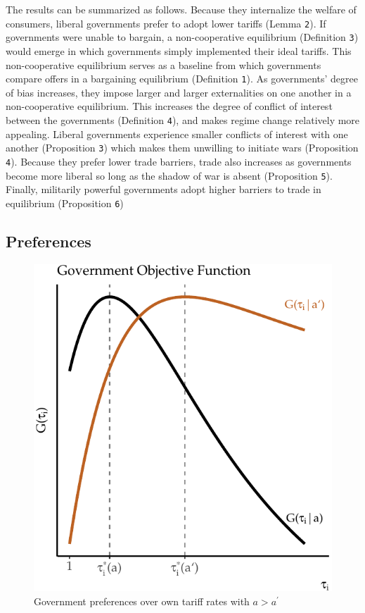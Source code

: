 \documentclass{puthesis}
\begin{document}
The results can be summarized as follows. Because they internalize the
welfare of consumers, liberal governments prefer to adopt lower tariffs
(Lemma \texttt{2}). If governments were unable to bargain, a
non-cooperative equilibrium (Definition \texttt{3}) would emerge in
which governments simply implemented their ideal tariffs. This
non-cooperative equilibrium serves as a baseline from which governments
compare offers in a bargaining equilibrium (Definition \texttt{1}). As
governments' degree of bias increases, they impose larger and larger
externalities on one another in a non-cooperative equilibrium. This
increases the degree of conflict of interest between the governments
(Definition \texttt{4}), and makes regime change relatively more
appealing. Liberal governments experience smaller conflicts of interest
with one another (Proposition \texttt{3}) which makes them unwilling to
initiate wars (Proposition \texttt{4}). Because they prefer lower trade
barriers, trade also increases as governments become more liberal so
long as the shadow of war is absent (Proposition \texttt{5}). Finally,
militarily powerful governments adopt higher barriers to trade in
equilibrium (Proposition \texttt{6})

\subsection{Preferences}

\begin{figure}
\centering
\includegraphics{figure/G-1.pdf}
\caption{Government preferences over own tariff rates with
\(a > a^\prime\) \label{fig:G}}
\end{figure}
\end{document}
